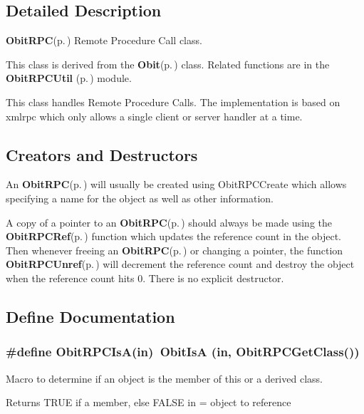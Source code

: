 \subsection{Detailed Description}
{\bf Obit\-RPC}{\rm (p.\,\pageref{structObitRPC})} Remote Procedure Call class. 

This class is derived from the {\bf Obit}{\rm (p.\,\pageref{structObit})} class. Related functions are in the {\bf Obit\-RPCUtil }{\rm (p.\,\pageref{ObitRPCUtil_8h})} module.

This class handles Remote Procedure Calls. The implementation is based on xmlrpc which only allows a single client or server handler at a time.\subsection{Creators and Destructors}\label{ObitRPC_8h_ObitRPCaccess}
An {\bf Obit\-RPC}{\rm (p.\,\pageref{structObitRPC})} will usually be created using Obit\-RPCCreate which allows specifying a name for the object as well as other information.

A copy of a pointer to an {\bf Obit\-RPC}{\rm (p.\,\pageref{structObitRPC})} should always be made using the {\bf Obit\-RPCRef}{\rm (p.\,\pageref{ObitRPC_8h_a1})} function which updates the reference count in the object. Then whenever freeing an {\bf Obit\-RPC}{\rm (p.\,\pageref{structObitRPC})} or changing a pointer, the function {\bf Obit\-RPCUnref}{\rm (p.\,\pageref{ObitRPC_8h_a0})} will decrement the reference count and destroy the object when the reference count hits 0. There is no explicit destructor.

\subsection{Define Documentation}
\subsubsection{\setlength{\rightskip}{0pt plus 5cm}\#define Obit\-RPCIs\-A(in)\ Obit\-Is\-A (in, Obit\-RPCGet\-Class())}\label{ObitRPC_8h_a2}


Macro to determine if an object is the member of this or a derived class. 

Returns TRUE if a member, else FALSE in = object to reference 
